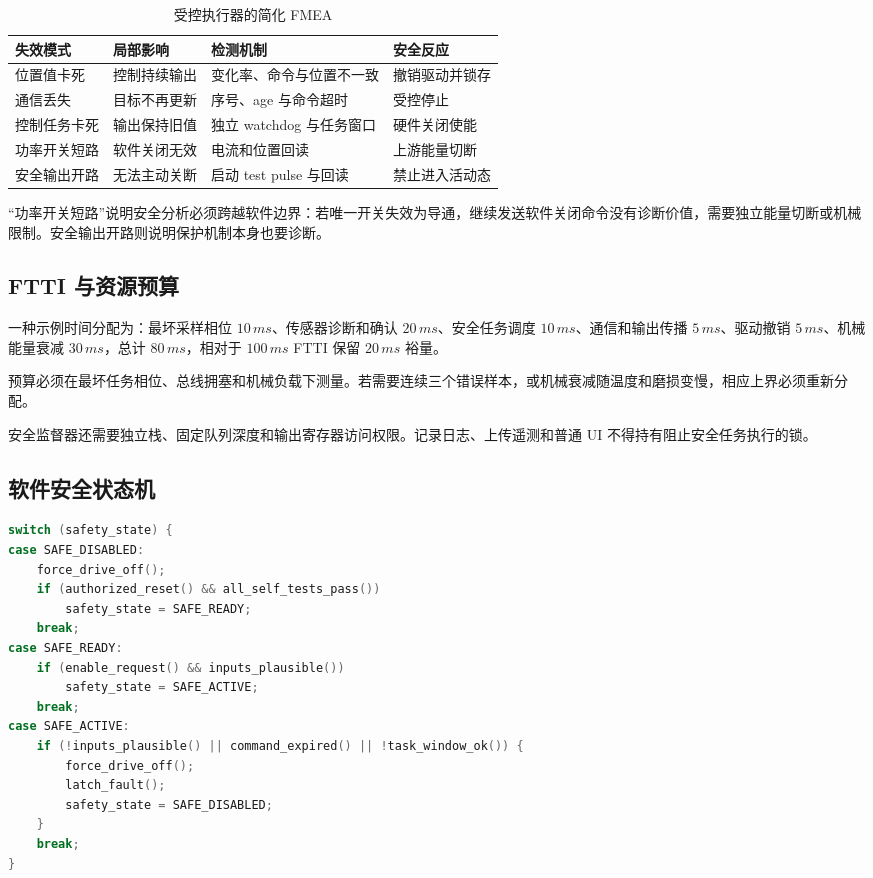 \begin{table}[H]
  \centering
  \caption{受控执行器的简化 FMEA}
  \begin{tabular}{p{25mm}p{30mm}p{38mm}p{33mm}}
    \hline
    失效模式 & 局部影响 & 检测机制 & 安全反应 \\
    \hline
    位置值卡死 & 控制持续输出 & 变化率、命令与位置不一致 & 撤销驱动并锁存 \\
    通信丢失 & 目标不再更新 & 序号、age 与命令超时 & 受控停止 \\
    控制任务卡死 & 输出保持旧值 & 独立 watchdog 与任务窗口 & 硬件关闭使能 \\
    功率开关短路 & 软件关闭无效 & 电流和位置回读 & 上游能量切断 \\
    安全输出开路 & 无法主动关断 & 启动 test pulse 与回读 & 禁止进入活动态 \\
    \hline
  \end{tabular}
\end{table}

“功率开关短路”说明安全分析必须跨越软件边界：若唯一开关失效为导通，继续发送软件关闭命令没有诊断价值，需要独立能量切断或机械限制。安全输出开路则说明保护机制本身也要诊断。

\subsection{FTTI 与资源预算}

一种示例时间分配为：最坏采样相位 $10\,ms$、传感器诊断和确认 $20\,ms$、安全任务调度 $10\,ms$、通信和输出传播 $5\,ms$、驱动撤销 $5\,ms$、机械能量衰减 $30\,ms$，总计 $80\,ms$，相对于 $100\,ms$ FTTI 保留 $20\,ms$ 裕量。

预算必须在最坏任务相位、总线拥塞和机械负载下测量。若需要连续三个错误样本，或机械衰减随温度和磨损变慢，相应上界必须重新分配。

安全监督器还需要独立栈、固定队列深度和输出寄存器访问权限。记录日志、上传遥测和普通 UI 不得持有阻止安全任务执行的锁。

\subsection{软件安全状态机}

\noindent\begin{minipage}{\textwidth}
\begin{lstlisting}[language=C,caption={执行器安全监督状态机（伪代码）}]
switch (safety_state) {
case SAFE_DISABLED:
    force_drive_off();
    if (authorized_reset() && all_self_tests_pass())
        safety_state = SAFE_READY;
    break;
case SAFE_READY:
    if (enable_request() && inputs_plausible())
        safety_state = SAFE_ACTIVE;
    break;
case SAFE_ACTIVE:
    if (!inputs_plausible() || command_expired() || !task_window_ok()) {
        force_drive_off();
        latch_fault();
        safety_state = SAFE_DISABLED;
    }
    break;
}
\end{lstlisting}
\end{minipage}

